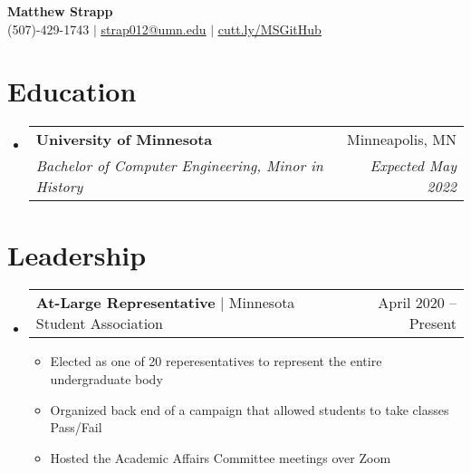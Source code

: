 \documentclass[letterpaper,11pt]{article}
\makeatletter
\newcommand{\resumeItem}[1]{
  \item\small{
    {#1 \vspace{-2pt}}
  }
}
\newcommand{\resumeSubheading}[4]{
  \vspace{-2pt}\item
    \begin{tabular*}{0.97\textwidth}[t]{l@{\extracolsep{\fill}}r}
      \textbf{#1} & #2 \\
      \textit{\small#3} & \textit{\small #4} \\
    \end{tabular*}\vspace{-7pt}
}
\newcommand{\resumeSubSubheading}[2]{
    \item
    \begin{tabular*}{0.97\textwidth}{l@{\extracolsep{\fill}}r}
      \textit{\small#1} & \textit{\small #2} \\
    \end{tabular*}\vspace{-7pt}
}
\newcommand{\resumeProjectHeading}[2]{
    \item
    \begin{tabular*}{0.97\textwidth}{l@{\extracolsep{\fill}}r}
      \small#1 & #2 \\
    \end{tabular*}\vspace{-7pt}
}
\newcommand{\resumeSubItem}[1]{\resumeItem{#1}\vspace{-4pt}}
\newcommand{\resumeSubHeadingListStart}{\begin{itemize}[leftmargin=0.15in, label={}]}
\newcommand{\resumeSubHeadingListEnd}{\end{itemize}}
\newcommand{\resumeItemListStart}{\begin{itemize}}
\newcommand{\resumeItemListEnd}{\end{itemize}\vspace{-5pt}}
\makeatother
\begin{document}

\begin{center}
    \textbf{\Huge Matthew Strapp} \\ \vspace{1pt}
    \small (507)-429-1743 $|$ \href{mailto:strap012@umn.edu}{\underline{strap012@umn.edu}} $|$ 
    \href{https://cutt.ly/MSGitHub}{\underline{cutt.ly/MSGitHub}}
\end{center}


\section{Education}
  \resumeSubHeadingListStart
    \resumeSubheading
      {University of Minnesota}{Minneapolis, MN}
      {Bachelor of Computer Engineering, Minor in History}{Expected May 2022}
  \resumeSubHeadingListEnd

\section{Leadership}
    \resumeSubHeadingListStart
        \resumeProjectHeading 
            {\textbf{At-Large Representative} $|$ Minnesota Student Association}{April 2020 -- Present}
        \resumeItemListStart
            \resumeItem{Elected as one of 20 reperesentatives to represent the entire undergraduate body}
            \resumeItem{Organized back end of a campaign that allowed students to take classes Pass/Fail}
            \resumeItem{Hosted the Academic Affairs Committee meetings over Zoom}
        \resumeItemListEnd
    \resumeSubHeadingListEnd

\end{document}
